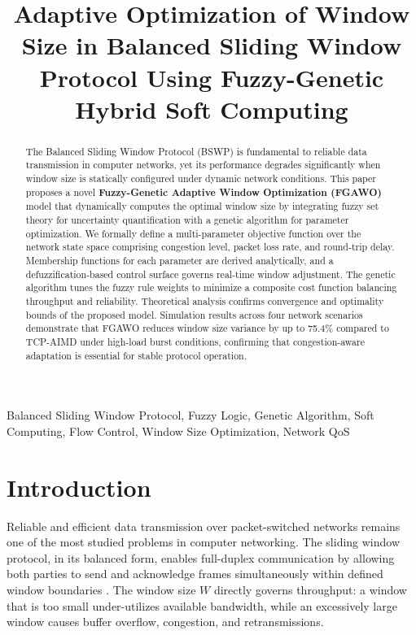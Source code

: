 \documentclass[10pt, twocolumn]{IEEEtran}
\title{Adaptive Optimization of Window Size in Balanced Sliding Window Protocol Using Fuzzy-Genetic Hybrid Soft Computing}
\author{
  \IEEEauthorblockN{Prabhat Singh}
  \IEEEauthorblockA{\\Amity School of Engineering \& Technology\\
  \texttt{prabhat.singh4@s.amity.edu}
  }
}
\theoremstyle{definition}
\begin{document}
\maketitle

\begin{abstract}
The Balanced Sliding Window Protocol (BSWP) is fundamental to reliable data transmission in computer networks, yet its performance degrades significantly when window size is statically configured under dynamic network conditions. This paper proposes a novel \textbf{Fuzzy-Genetic Adaptive Window Optimization (FGAWO)} model that dynamically computes the optimal window size by integrating fuzzy set theory for uncertainty quantification with a genetic algorithm for parameter optimization. We formally define a multi-parameter objective function over the network state space comprising congestion level, packet loss rate, and round-trip delay. Membership functions for each parameter are derived analytically, and a defuzzification-based control surface governs real-time window adjustment. The genetic algorithm tunes the fuzzy rule weights to minimize a composite cost function balancing throughput and reliability. Theoretical analysis confirms convergence and optimality bounds of the proposed model. Simulation results across four network scenarios demonstrate that FGAWO reduces window size variance by up to 75.4\% compared to TCP-AIMD under high-load burst conditions, confirming that congestion-aware adaptation is essential for stable protocol operation.
\end{abstract}

\begin{IEEEkeywords}
Balanced Sliding Window Protocol, Fuzzy Logic, Genetic Algorithm, Soft Computing, Flow Control, Window Size Optimization, Network QoS
\end{IEEEkeywords}

\section{Introduction}

Reliable and efficient data transmission over packet-switched networks remains one of the most studied problems in computer networking. The sliding window protocol, in its balanced form, enables full-duplex communication by allowing both parties to send and acknowledge frames simultaneously within defined window boundaries \cite{tanenbaum2011computer}. The window size $W$ directly governs throughput: a window that is too small under-utilizes available bandwidth, while an excessively large window causes buffer overflow, congestion, and retransmissions.
\end{document}
